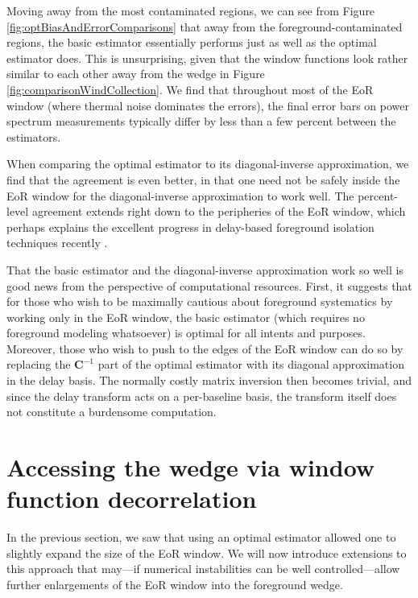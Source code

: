 \documentclass[twocolumn,aps,prd,nofootinbib,showpacs]{revtex4-1}
\begin{document}
Moving away from the most contaminated regions, we can see from Figure \ref{fig:optBiasAndErrorComparisons} that away from the foreground-contaminated regions, the basic estimator essentially performs just as well as the optimal estimator does.  This is unsurprising, given that the window functions look rather similar to each other away from the wedge in Figure \ref{fig:comparisonWindCollection}.  We find that throughout most of the EoR window (where thermal noise dominates the errors), the final error bars on power spectrum measurements typically differ by less than a few percent between the estimators.

When comparing the optimal estimator to its diagonal-inverse approximation, we find that the agreement is even better, in that one need not be safely inside the EoR window for the diagonal-inverse approximation to work well.  The percent-level agreement extends right down to the peripheries of the EoR window, which perhaps explains the excellent progress in delay-based foreground isolation techniques recently \cite{Parsons2013}.

That the basic estimator and the diagonal-inverse approximation work so well is good news from the perspective of computational resources.  First, it suggests that for those who wish to be maximally cautious about foreground systematics by working only in the EoR window, the basic estimator (which requires no foreground modeling whatsoever) is optimal for all intents and purposes.  Moreover, those who wish to push to the edges of the EoR window can do so by replacing the $\mathbf{C}^{-1}$ part of the optimal estimator with its diagonal approximation in the delay basis.  The normally costly matrix inversion then becomes trivial, and since the delay transform acts on a per-baseline basis, the transform itself does not constitute a burdensome computation.


\section{Accessing the wedge via window function decorrelation}
\label{sec:Decorr}
In the previous section, we saw that using an optimal estimator allowed one to slightly expand the size of the EoR window.  We will now introduce extensions to this approach that may---if numerical instabilities can be well controlled---allow further enlargements of the EoR window into the foreground wedge.
\end{document}

